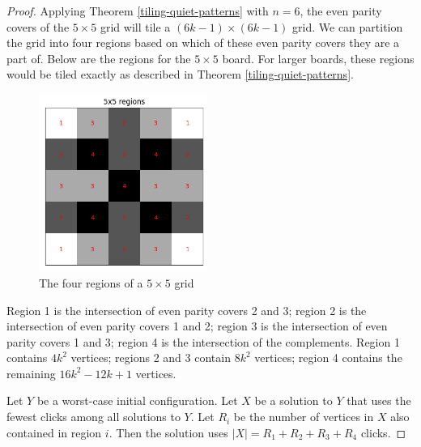 \documentclass[a4paper]{article}
\newcommand{\abs}[1]{\left| #1 \right|}
\begin{document}
	\begin{proof}
		Applying Theorem \ref{tiling-quiet-patterns} with $n=6$, the even parity covers of the $5 \times 5$ grid will tile a $(6k - 1) \times (6k - 1)$ grid.
		We can partition the grid into four regions based on which of these even parity covers they are a part of.
		Below are the regions for the $5 \times 5$ board.
		For larger boards, these regions would be tiled exactly as described in Theorem \ref{tiling-quiet-patterns}.
		
		\begin{figure}[H]
			\centering
			\includegraphics[width=0.49\textwidth]{5x5_regions.png}
			\caption{The four regions of a $5 \times 5$ grid}
		\end{figure}
		
		Region 1 is the intersection of even parity covers 2 and 3;
		region 2 is the intersection of even parity covers 1 and 2;
		region 3 is the intersection of even parity covers 1 and 3;
		region 4 is the intersection of the complements.
		Region 1 contains $4k^2$ vertices;
		regions 2 and 3 contain $8k^2$ vertices;
		region 4 contains the remaining $16k^2 - 12k + 1$ vertices.
		
		Let $Y$ be a worst-case initial configuration.
		Let $X$ be a solution to $Y$ that uses the fewest clicks among all solutions to $Y$.
		Let $R_i$ be the number of vertices in $X$ also contained in region $i$.
		Then the solution uses $\abs{X} = R_1 + R_2 + R_3 + R_4$ clicks.
		

\end{proof}
\end{document}
